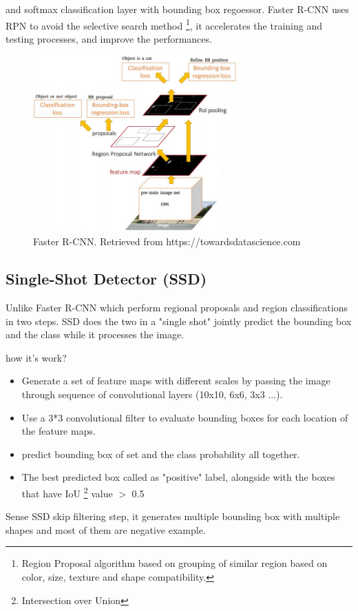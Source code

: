 \documentclass[12pt]{report}
\begin{document}
                and softmax classification layer with bounding box regoessor.
                Faster R-CNN uses RPN to avoid the 
                selective search method \footnote{ Region Proposal algorithm based on grouping of similar region based on color, size, texture and shape compatibility.}, 
                it accelerates the training and testing 
                processes, and improve the performances. \cite{Ren2017a}
                    \begin{figure}[h]
                    \centering
                    \includegraphics[width=0.7\textwidth]{./images/frcnn.png}
                    \caption{Faster R-CNN. Retrieved from https://towardsdatascience.com}
                    \label{fig:frcnn}
                    \end{figure} 

                \subsection{Single-Shot Detector (SSD)}
                 
                    Unlike Faster R-CNN which perform regional proposals 
                    and region classifications in two steps. SSD does the two in a "single shot"
                    jointly predict the bounding box and the class while it processes the image.

                    how it's work?
                    \begin{itemize}
                        \item Generate a set of feature maps with different scales 
                        by passing the image through sequence of convolutional layers (10x10, 6x6, 3x3 ...).
                        \item Use a 3*3 convolutional filter to evaluate bounding boxes for each location of the feature maps.
                        \item predict bounding box of set and the class probability all together.
                        \item The best predicted box called as "positive" label, alongside with
                        the boxes that have IoU \footnote{Intersection over Union } value $>$ 0.5 
                    \end{itemize}
                    Sense SSD skip filtering step, it generates multiple bounding box with multiple shapes
                    and most of them are negative example.
\end{document}
